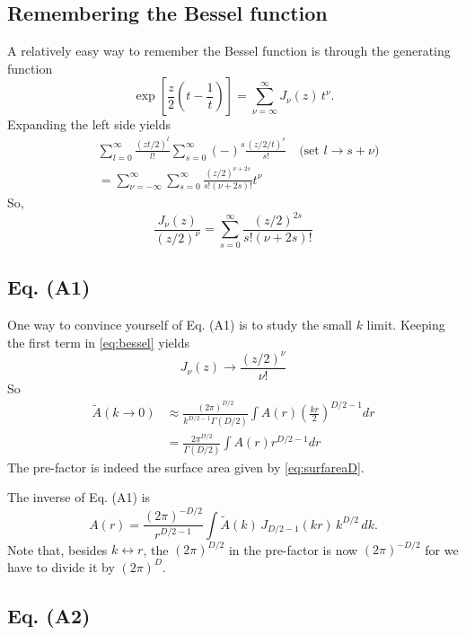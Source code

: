 \documentclass[aip,jcp,reprint,superscriptaddress]{revtex4-1}
\numberwithin{equation}{subsection}
\begin{document}
\subsection{Remembering the Bessel function}

A relatively easy way to remember the Bessel function
is through the generating function
\[
  \exp\left[ \frac{z}{2} \left(t - \frac{1}{t}\right) \right]
  =
  \sum_{\nu = \infty}^\infty J_\nu(z) \, t^\nu.
\]
%
Expanding the left side yields
\begin{align*}
&
  \sum_{l = 0}^\infty \frac{ (zt/2)^l } { l! }
  \sum_{s = 0}^\infty (-)^s \frac{ (z/2/t)^s } { s! }
  \quad \mbox{(set $l \rightarrow s + \nu$)} \\
&=
  \sum_{\nu = -\infty}^\infty
  \sum_{s = 0}^\infty
  \frac { (z/2)^{\nu + 2s} } {s! (\nu + 2s)! } t^\nu
\end{align*}
So,
\begin{equation}
  \frac{ J_\nu(z) }{ (z/2)^\nu }
=
  \sum_{s = 0}^\infty
  \frac{ (z/2)^{2s} } { s! (\nu + 2s)! }
  \label{eq:bessel}
\end{equation}



\subsection{Eq. (A1)}

One way to convince yourself of Eq. (A1) is to study the small $k$ limit.
%
Keeping the first term in \eqref{eq:bessel} yields
\[
  J_\nu(z) \rightarrow \frac{ (z/2)^\nu }{ \nu! }
\]
So
%
\begin{align*}
\tilde A(k \rightarrow 0)
&\approx
\frac{ (2 \pi)^{D/2} } { k^{D/2 - 1} \Gamma(D/2) }
\int A(r) \left( \frac{k r}{2} \right)^{D/2 - 1} dr \\
&=
\frac{ 2 \pi^{D/2} } { \Gamma(D/2) }
\int A(r) r^{D/2 - 1} dr
\end{align*}
%
The pre-factor is indeed the surface area
given by \eqref{eq:surfareaD}.


The inverse of Eq. (A1) is
\begin{equation}
A(r)
=
\frac{ (2\pi)^{-D/2} } { r^{D/2 - 1} }
\int \tilde{A}(k) \, J_{D/2-1}(kr) \, k^{D/2} \, dk.
\label{eq:invftsphr}
\end{equation}
Note that, besides $k \leftrightarrow r$,
the $(2\pi)^{D/2}$ in the pre-factor is now $(2\pi)^{-D/2}$
for we have to divide it by $(2\pi)^D$.


\subsection{Eq. (A2)}
\end{document}
